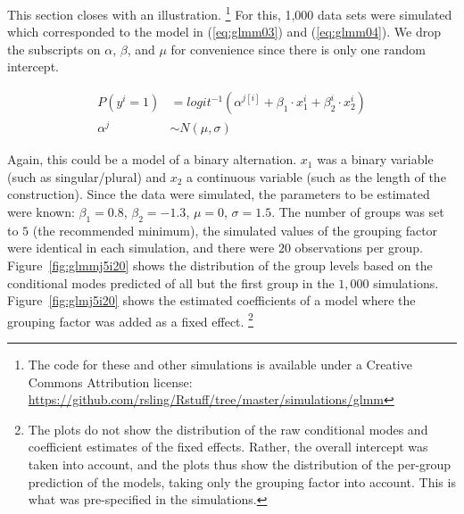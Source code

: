 \documentclass[a4paper,12pt]{article}
\begin{document}
This section closes with an illustration.%
\footnote{The code for these and other simulations is available under a Creative Commons Attribution license: \url{https://github.com/rsling/Rstuff/tree/master/simulations/glmm}}
For this, 1,000 data sets were simulated which corresponded to the model in (\ref{eq:glmm03}) and (\ref{eq:glmm04}).
We drop the subscripts on $\alpha$, $\beta$, and $\mu$ for convenience since there is only one random intercept.

\begin{align}
  P(y^i=1) & =logit^{-1}(\alpha^{j[i]}+\beta_1\cdot x_1^i+\beta_2^i\cdot x_2^i)
  \label{eq:glmm03}\\
  \alpha^j & \sim N(\mu, \sigma)\label{eq:glmm04}
\end{align}

Again, this could be a model of a binary alternation.
$x_1$ was a binary variable (such as singular\slash plural) and $x_2$ a continuous variable (such as the length of the construction).
Since the data were simulated, the parameters to be estimated were known: $\beta_1=0.8$, $\beta_2=-1.3$, $\mu=0$, $\sigma=1.5$.
The number of groups was set to $5$ (the recommended minimum), the simulated values of the grouping factor were identical in each simulation, and there were $20$ observations per group.
Figure~\ref{fig:glmmj5i20} shows the distribution of the group levels based on the conditional modes predicted of all but the first group in the $1,000$ simulations.
Figure~\ref{fig:glmj5i20} shows the estimated coefficients of a model where the grouping factor was added as a fixed effect.%
\footnote{The plots do not show the distribution of the raw conditional modes and coefficient estimates of the fixed effects.
Rather, the overall intercept was taken into account, and the plots thus show the distribution of the per-group prediction of the models, taking only the grouping factor into account.
This is what was pre-specified in the simulations.}
\end{document}
